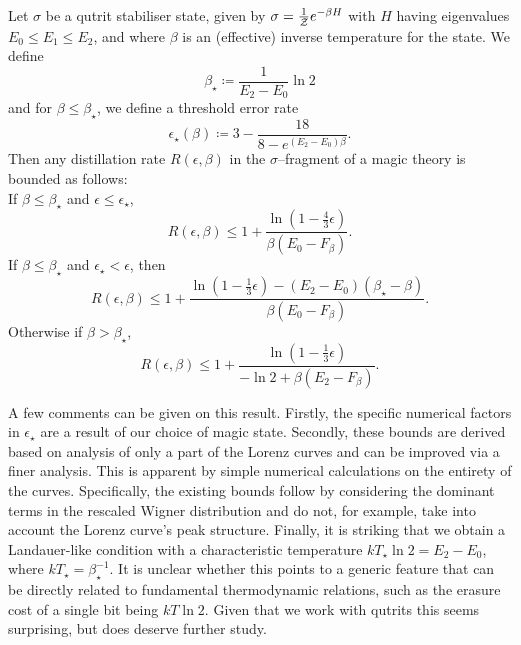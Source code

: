 \documentclass[pra,
aps,
twocolumn,
superscriptaddress,
groupedaddress,
nofootinbib,
reprint
]{revtex4-1}
\begin{document}
\begin{theorem}\label{thm:stab_bounds}
	Let $\sigma$ be a qutrit stabiliser state, given by $\sigma = \frac{1}{\mathcal{Z}} e^{-\beta H}$ with $H$ having eigenvalues $E_0 \le E_1 \le E_2$, and where $\beta$ is an (effective) inverse temperature for the state. 
We define
\begin{equation}
	\beta_\star \coloneqq \frac{1}{E_2 - E_0} \ln{2}
\end{equation}
and for $\beta \leq \beta_\star$, we define a threshold error rate
\begin{equation}
	\epsilon_{\star}(\beta) \coloneqq 3 - \dfrac{18}{8-e^{(E_2 - E_0)\beta}}.
\end{equation}
Then any distillation rate $R(\epsilon, \beta)$ in the $\sigma$--fragment of a magic theory is bounded as follows:\\
If $\beta \leq \beta_{\star}$ and $\epsilon  \leq \epsilon_{\star}$,
\begin{equation}
	R(\epsilon,\beta) \leq 1 + \frac{\ln{\left( 1 - \frac{4}{3}\epsilon \right)}}{\beta (E_0 - F_\beta)}.
\end{equation}
If $\beta \leq \beta_{\star}$ and $\epsilon_{\star} < \epsilon$, then
\begin{equation}
	R(\epsilon, \beta) \le 1 + \frac{\ln{\left(1-\frac{1}{3}\epsilon \right)} - (E_2 - E_0)(\beta_{\star} - \beta)}{\beta (E_0 - F_\beta)}.
\end{equation}
Otherwise if $\beta > \beta_{\star}$,
\begin{equation}
	R(\epsilon, \beta) \leq  1+ \frac{\ln{\left(1-\frac{1}{3}\epsilon \right)}}{-\ln{2} + \beta (E_2 - F_\beta)}.
\end{equation}
\end{theorem}
A few comments can be given on this result. 
Firstly, the specific numerical factors in $\epsilon_\star$ are a result of our choice of magic state. 
Secondly, these bounds are derived based on analysis of only a part of the Lorenz curves and can be improved via a finer analysis. 
This is apparent by simple numerical calculations on the entirety of the curves.
Specifically, the existing bounds follow by considering the dominant terms in the rescaled Wigner distribution and do not, for example, take into account the Lorenz curve's peak structure. 
Finally, it is striking that we obtain a Landauer-like condition with a characteristic temperature $kT_\star \ln 2 = E_2 - E_0$, where $kT_\star = \beta_\star^{-1}$. 
It is unclear whether this points to a generic feature that can be directly related to fundamental thermodynamic relations, such as the erasure cost of a single bit being $kT \ln 2$. 
Given that we work with qutrits this seems surprising, but does deserve further study.
\end{document}
